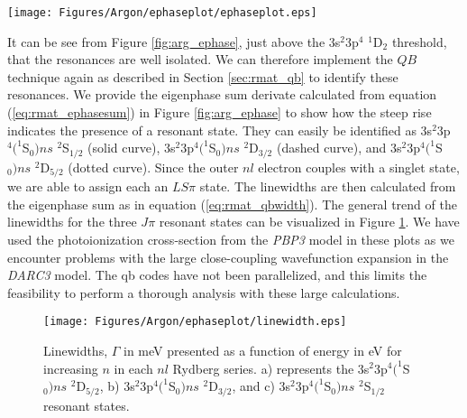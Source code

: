 %
\begin{sidewaysfigure}
\centering
\texttt{[image: Figures/Argon/ephaseplot/ephaseplot.eps]}
\caption{The derivative of the eigenphase sum just above the 3s$^2$3p$^4$ $^1$D$_2$ threshold as function of photon energy in eV. The solid black curve are the 3s$^2$3p$^4(^1$S$_0)ns$ $^2$S$_{1/2}$ resonant states, the dashed curve is for 3s$^2$3p$^4(^1$S$_0)ns$ $^2$D$_{3/2}$ and the dotted curve are the 3s$^2$3p$^4(^1$S$_0)ns$ $^2$D$_{5/2}$ even resonant states. The corresponding photoionization cross-section from the initial statistically weighted $^2$P$^{\rm{o}}$ to allowed final states in Mb is presented on the lower graph also as a function of photon energy in eV. \label{fig:arg_ephase}}
\end{sidewaysfigure}
%

It can be see  from Figure \ref{fig:arg_ephase}, just above the 3s$^2$3p$^4$ $^1$D$_2$ threshold, that the resonances are well isolated. We can therefore implement the $QB$ technique again as described in Section \ref{sec:rmat_qb} to identify these resonances. We provide the eigenphase sum derivate calculated from equation (\ref{eq:rmat_ephasesum}) in Figure \ref{fig:arg_ephase} to show how the steep rise indicates the presence of a resonant state. They can easily be identified as 3s$^2$3p$^4(^1$S$_0)ns$ $^2$S$_{1/2}$ (solid curve), 3s$^2$3p$^4(^1$S$_0)ns$ $^2$D$_{3/2}$ (dashed curve), and 3s$^2$3p$^4(^1$S$_0)ns$ $^2$D$_{5/2}$ (dotted curve). Since the outer $nl$ electron couples with a singlet state, we are able to assign each an $LS\pi$ state. The linewidths are then calculated from the eigenphase sum as in equation (\ref{eq:rmat_qbwidth}). The general trend of the linewidths for the three $J\pi$ resonant states can be visualized in Figure \ref{fig:arg_linewidths}. We have used the photoionization cross-section from the \textit{PBP3} model in these plots as we encounter problems with the large close-coupling wavefunction expansion in the \textit{DARC3} model. The {\sc qb} codes have not been parallelized, and this limits the feasibility to perform a thorough analysis with these large calculations. 


\begin{figure}
\texttt{[image: Figures/Argon/ephaseplot/linewidth.eps]}
\caption{Linewidths, $\Gamma$ in meV presented as a function of energy in eV for increasing $n$ in each $nl$ Rydberg series. a) represents the 3s$^2$3p$^4(^1$S$_0)ns$ $^2$D$_{5/2}$, b) 3s$^2$3p$^4(^1$S$_0)ns$ $^2$D$_{3/2}$, and c) 3s$^2$3p$^4(^1$S$_0)ns$ $^2$S$_{1/2}$ resonant states. \label{fig:arg_linewidths}}
\end{figure}

